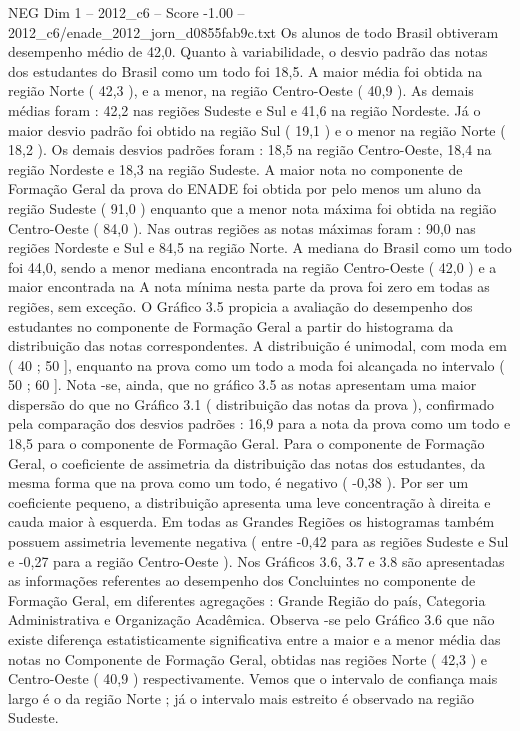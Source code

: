 \begin{textsample}{NEG Dim 1 – 2012\_c6 – Score -1.00 – 2012\_c6/enade\_2012\_jorn\_d0855fab9c.txt}
Os alunos de todo Brasil obtiveram desempenho médio de 42,0.
Quanto à variabilidade, o desvio padrão das notas dos estudantes do Brasil como um todo foi 18,5.
A maior média foi obtida na região Norte ( 42,3 ), e a menor, na região Centro-Oeste ( 40,9 ).
As demais médias foram : 42,2 nas regiões Sudeste e Sul e 41,6 na região Nordeste.
Já o maior desvio padrão foi obtido na região Sul ( 19,1 ) e o menor na região Norte ( 18,2 ).
Os demais desvios padrões foram : 18,5 na região Centro-Oeste, 18,4 na região Nordeste e 18,3 na região Sudeste.
A maior nota no componente de Formação Geral da prova do ENADE foi obtida por pelo menos um aluno da região Sudeste ( 91,0 ) enquanto que a menor nota máxima foi obtida na região Centro-Oeste ( 84,0 ).
Nas outras regiões as notas máximas foram : 90,0 nas regiões Nordeste e Sul e 84,5 na região Norte.
A mediana do Brasil como um todo foi 44,0, sendo a menor mediana encontrada na região Centro-Oeste ( 42,0 ) e a maior encontrada na A nota mínima nesta parte da prova foi zero em todas as regiões, sem exceção.
O Gráfico 3.5 propicia a avaliação do desempenho dos estudantes no componente de Formação Geral a partir do histograma da distribuição das notas correspondentes.
A distribuição é unimodal, com moda em ( 40 ; 50 ], enquanto na prova como um todo a moda foi alcançada no intervalo ( 50 ; 60 ].
Nota -se, ainda, que no gráfico 3.5 as notas apresentam uma maior dispersão do que no Gráfico 3.1 ( distribuição das notas da prova ), confirmado pela comparação dos desvios padrões : 16,9 para a nota da prova como um todo e 18,5 para o componente de Formação Geral.
Para o componente de Formação Geral, o coeficiente de assimetria da distribuição das notas dos estudantes, da mesma forma que na prova como um todo, é negativo ( -0,38 ).
Por ser um coeficiente pequeno, a distribuição apresenta uma leve concentração à direita e cauda maior à esquerda.
Em todas as Grandes Regiões os histogramas também possuem assimetria levemente negativa ( entre -0,42 para as regiões Sudeste e Sul e -0,27 para a região Centro-Oeste ).
Nos Gráficos 3.6, 3.7 e 3.8 são apresentadas as informações referentes ao desempenho dos Concluintes no componente de Formação Geral, em diferentes agregações : Grande Região do país, Categoria Administrativa e Organização Acadêmica.
Observa -se pelo Gráfico 3.6 que não existe diferença estatisticamente significativa entre a maior e a menor média das notas no Componente de Formação Geral, obtidas nas regiões Norte ( 42,3 ) e Centro-Oeste ( 40,9 ) respectivamente.
Vemos que o intervalo de confiança mais largo é o da região Norte ; já o intervalo mais estreito é observado na região Sudeste.

\end{textsample}
